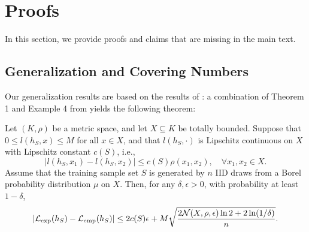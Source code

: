 \appendix

\section{Proofs}
In this section, we provide  proofs and claims that are missing in the main text.


\subsection{Generalization and Covering Numbers}\label{app:gen}
Our generalization results are based on the results of \cite{xu_robustness_2012}: a combination of Theorem 1 and Example 4 from  \cite{xu_robustness_2012} yields the following theorem:

\begin{theorem}\label{thm:xu}
Let $(K,\rho)$ be a metric space, and let $X\subseteq K$ be totally bounded. Suppose that
$0\le l(h_S,x)\le M$ for all $x\in X$, and that $l(h_S,\cdot)$ is Lipschitz continuous on $X$ with Lipschitz constant $c(S)$, i.e.,
\begin{equation*}
|l(h_S,x_1)-l(h_S,x_2)|
\le c(S)\rho(x_1,x_2),
\quad \forall x_1,x_2\in X.
\end{equation*}
Assume that the training sample set $S$ is generated by $n$ IID draws from a Borel probability distribution $\mu$ on $X$. Then, for any $\delta,\epsilon>0$, with probability at least $1-\delta$,
\begin{equation}\label{eq:intermediate}
|\mathcal{L}_{\mathrm{exp}}(h_S)-\mathcal{L}_{\mathrm{emp}}(h_S)|
\le
2c(S)\epsilon
+
M\sqrt{
\frac{
2\mathcal{N}(X,\rho,\epsilon)\ln 2
+
2\ln(1/\delta)
}{n}
}.
\end{equation}
\end{theorem}



